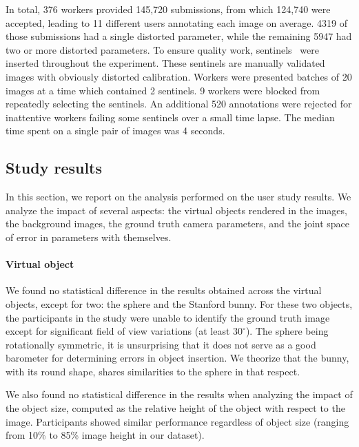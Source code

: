 In total, 376 workers provided 145,720 submissions, from which 124,740 were accepted, leading to 11 different users annotating each image on average. 4319 of those submissions had a single distorted parameter, while the remaining 5947 had two or more distorted parameters. To ensure quality work, sentinels~\cite{Gingold2012} were inserted throughout the experiment. These sentinels are manually validated images with obviously distorted calibration. Workers were presented batches of 20 images at a time which contained 2 sentinels. 9 workers were blocked from repeatedly selecting the sentinels. An additional 520 annotations were rejected for inattentive workers failing some sentinels over a small time lapse. The median time spent on a single pair of images was 4 seconds.


\subsection{Study results}

In this section, we report on the analysis performed on the user study results. We analyze the impact of several aspects: the virtual objects rendered in the images, the background images, the ground truth camera parameters, and the joint space of error in parameters with themselves.


\paragraph{Virtual object}

We found no statistical difference in the results obtained across the virtual objects, except for two: the sphere and the Stanford bunny. For these two objects, the participants in the study were unable to identify the ground truth image except for significant field of view variations (at least $30^\circ$). The sphere being rotationally symmetric, it is unsurprising that it does not serve as a good barometer for determining errors in object insertion. We theorize that the bunny, with its round shape, shares similarities to the sphere in that respect. 

We also found no statistical difference in the results when analyzing the impact of the object size, computed as the relative height of the object with respect to the image. Participants showed similar performance regardless of object size (ranging from 10\% to 85\% image height in our dataset).


